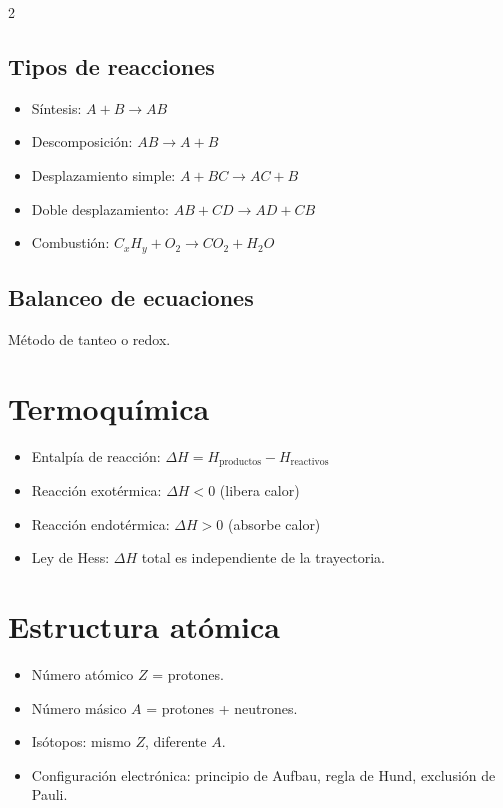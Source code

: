 \documentclass[12pt]{article}
\begin{document}
\begin{multicols}{2}
\subsection*{Tipos de reacciones}
\begin{itemize}[leftmargin=*]
    \item Síntesis: $A + B \rightarrow AB$
    \item Descomposición: $AB \rightarrow A + B$
    \item Desplazamiento simple: $A + BC \rightarrow AC + B$
    \item Doble desplazamiento: $AB + CD \rightarrow AD + CB$
    \item Combustión: $C_xH_y + O_2 \rightarrow CO_2 + H_2O$
\end{itemize}

\subsection*{Balanceo de ecuaciones}
Método de tanteo o redox.

\section*{Termoquímica}
\begin{itemize}[leftmargin=*]
    \item Entalpía de reacción: $\Delta H = H_{\text{productos}} - H_{\text{reactivos}}$
    \item Reacción exotérmica: $\Delta H < 0$ (libera calor)
    \item Reacción endotérmica: $\Delta H > 0$ (absorbe calor)
    \item Ley de Hess: $\Delta H$ total es independiente de la trayectoria.
\end{itemize}

\section*{Estructura atómica}
\begin{itemize}[leftmargin=*]
    \item Número atómico $Z$ = protones.
    \item Número másico $A$ = protones + neutrones.
    \item Isótopos: mismo $Z$, diferente $A$.
    \item Configuración electrónica: principio de Aufbau, regla de Hund, exclusión de Pauli.
\end{itemize}


\end{multicols}
\end{document}
